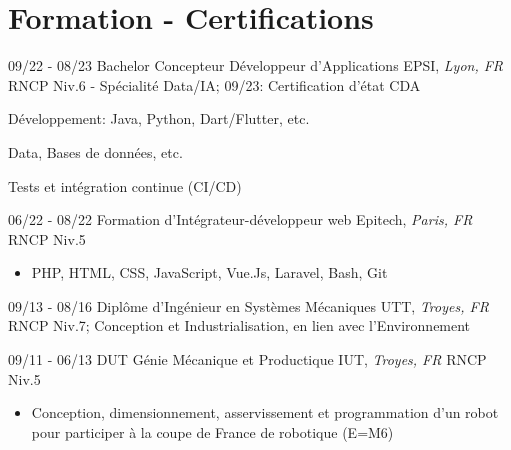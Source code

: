\documentclass[]{friggeri-cv}
\begin{document}
\section{Formation - Certifications}
\vspace*{-0.25cm}
\vspace{0.5mm}
\begin{entrylist}
  \entry
    {09/22 - 08/23}
    {Bachelor Concepteur Développeur d'Applications}
    {EPSI, \textit{Lyon, FR}}
    {RNCP Niv.6 - Spécialité Data/IA; \hspace{7mm} 09/23: Certification d'état CDA}
\end{entrylist}
\vspace*{-0.65cm}
\begin{itemize}
\setlength{\itemsep}{1pt}
\setlength{\parskip}{0pt}
\setlength{\parsep}{0pt}
\begin{multicols}{2}
\item Développement: \newline Java, Python, Dart/Flutter, etc.
\columnbreak
\item Data, Bases de données, etc.
\item Tests et intégration continue (CI/CD)
\end{multicols}
\end{itemize}\vspace{0.5mm}
\begin{entrylist}
  \entry
    {06/22 - 08/22}
    {Formation d'Intégrateur-développeur web}
    {Epitech, \textit{Paris, FR}}
    {RNCP Niv.5}
\end{entrylist}

\vspace*{-0.35cm}
\begin{itemize}
\setlength{\itemsep}{1pt}
\setlength{\parskip}{0pt}
\setlength{\parsep}{0pt}

\item PHP, HTML, CSS, JavaScript, Vue.Js, Laravel, Bash, Git
\end{itemize}\vspace{0.5mm}
\begin{entrylist}
  \entry
    {09/13 - 08/16}
    {Diplôme d'Ingénieur en Systèmes Mécaniques}
    {UTT, \textit{Troyes, FR}}
    {RNCP Niv.7; Conception et Industrialisation, en lien avec l’Environnement}
\end{entrylist}
\vspace{0.5mm}
\begin{entrylist}
  \entry
    {09/11 - 06/13}
    {DUT Génie Mécanique et Productique}
    {IUT, \textit{Troyes, FR}}
    {RNCP Niv.5}
\end{entrylist}
\vspace*{-0.4cm}
\begin{itemize}
\setlength{\itemsep}{1pt}
\setlength{\parskip}{0pt}
\setlength{\parsep}{0pt}
\item Conception, dimensionnement, asservissement et programmation d’un robot pour participer à la coupe de France de robotique (E=M6)
\end{itemize}
\end{document}
